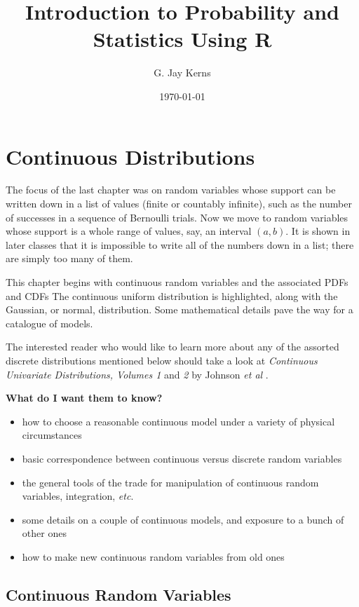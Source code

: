 \documentclass[captions=tableheading]{scrbook}
\title{Introduction to Probability and Statistics Using R}
\author{G. Jay Kerns}
\date{\today}
\begin{document}
\maketitle







\chapter{Continuous Distributions}
\label{sec-1}
\label{cha-Continuous-Distributions}


\noindent 
The focus of the last chapter was on random variables whose support can be written down in a list of values (finite or countably infinite), such as the number of successes in a sequence of Bernoulli trials. Now we move to random variables whose support is a whole range of values, say, an interval \((a,b)\). It is shown in later classes that it is impossible to write all of the numbers down in a list; there are simply too many of them.

This chapter begins with continuous random variables and the associated PDFs and CDFs The continuous uniform distribution is highlighted, along with the Gaussian, or normal, distribution. Some mathematical details pave the way for a catalogue of models.

The interested reader who would like to learn more about any of the assorted discrete distributions mentioned below should take a look at \emph{Continuous Univariate Distributions, Volumes 1} and \emph{2} by Johnson \emph{et al} \cite{Johnson1994,Johnson1995}.

\textbf{What do I want them to know?}
\begin{itemize}
\item how to choose a reasonable continuous model under a variety of physical circumstances
\item basic correspondence between continuous versus discrete random variables
\item the general tools of the trade for manipulation of continuous random variables, integration, \emph{etc}.
\item some details on a couple of continuous models, and exposure to a bunch of other ones
\item how to make new continuous random variables from old ones
\end{itemize}
\section{Continuous Random Variables}
\label{sec-1-1}
\label{sec-continuous-random-variables}
\end{document}
